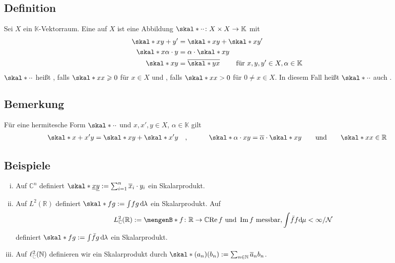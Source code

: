 \subsection[Definition: Hermitesche Form, Skalarprodukt]{Definition} %
\label{sub:71}
Sei $X$ ein $\mathds{K}$-Vektorraum. Eine  auf $X$ ist eine Abbildung $\skal*{\cdot}{\cdot} \colon X \times X \to \mathds{K}$ mit
\begin{align*}
	\skal*{x}{y+y'} &= \skal*{x}{y} + \skal*{x}{y'} \\
	\skal*{x}{\alpha \cdot y} &= \alpha \cdot \skal*{x}{y} \\
	\skal*{x}{y} &= \overline{\skal*{y}{x}} \qquad \text{ für } x,y,y' \in X, \alpha \in \mathds{K}       
\end{align*}
$\skal*{\cdot}{\cdot } $ heißt , falls $\skal*{x}{x}\ge 0$ für $x \in X$ und 
, falls 
$\skal*{x}{x} >0$ für $0 \not= x \in X$. In diesem Fall heißt $\skal*{\cdot }{\cdot }$ auch .  

\subsection[Bemerkung: Einfache Eigenschaften von hermiteschen Formen]{Bemerkung} %
\label{sub:72}
Für eine hermitesche Form $\skal*{\cdot}{\cdot}$ und $x,x',y \in X$, $\alpha \in \mathds{K}$ gilt 
\begin{align*}
	\skal*{x+x'}{y} = \skal*{x}{y} + \skal*{x'}{y} \quad , \quad \qquad 
	\skal*{\alpha \cdot x}{y} = \overline{\alpha} \cdot \skal*{x}{y} \qquad \text{und} \qquad 
	\skal*{x}{x} \in \mathds{R} 
\end{align*}

\subsection[Beispiele für hermitesche Formen]{Beispiele} %
\label{sub:73}
\begin{enumerate}[(i)]
	\item Auf $\mathds{C}^n$ definiert $\skal*{\underline{x}}{\underline{y}} := \sum_{i=1}^{n} \overline{x}_i \cdot y_i$ ein Skalarprodukt.
	\item Auf $L^2(\mathds{R})$ definiert $\skal*{f}{g} := \int\! fg \,\mathd\lambda$ ein Skalarprodukt.
	Auf 
	\[
		L^2_\mathds{C}(\mathds{R}) := \set[f \colon \mathds{R} \to \mathds{C}]{\re f \text{ und } \im f \text{ messbar}, \int \! \bar{f} f \mathd\mu < \infty } / \mathcal{N}
	\]
	definiert $\skal*{f}{g} := \int\! \bar{f} g \, \mathd\lambda$ ein Skalarprodukt.
	\item Auf $\ell^2_{\color{gray}\mathds{C}}(\mathds{N})$ definieren wir ein Skalarprodukt durch $\skal*{(a_n)}{(b_n)} := \sum_{n \in \mathds{N}} \overline{a}_n b_n$.
\end{enumerate}


